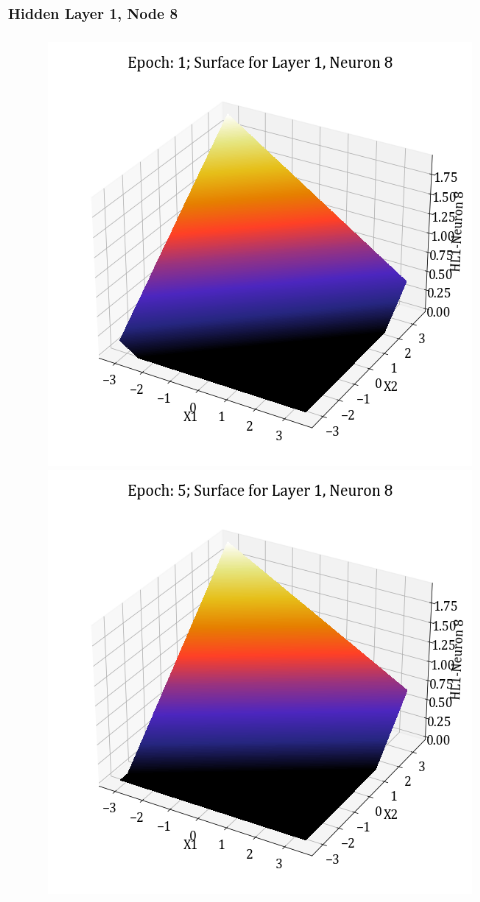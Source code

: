 \documentclass[11pt,a4paper]{article}
\begin{document}
\paragraph{Hidden Layer 1, Node 8}
\begin{figure}[H]
    \centering
    \includegraphics[scale=0.4]{images/1B_MLFFNN_E1_HL1_N8.png}
    \includegraphics[scale=0.4]{images/1B_MLFFNN_E5_HL1_N8.png}

\end{figure}
\end{document}
